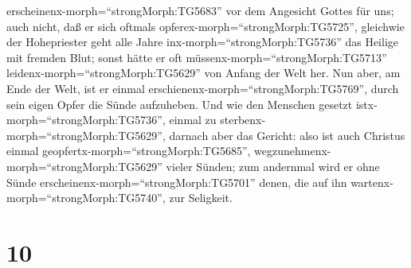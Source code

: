 erscheinenx-morph=``strongMorph:TG5683'' vor dem Angesicht Gottes für
uns;  auch nicht, daß er sich oftmals
opferex-morph=``strongMorph:TG5725'', gleichwie der Hohepriester geht
alle Jahre inx-morph=``strongMorph:TG5736'' das Heilige mit fremden
Blut;  sonst hätte er oft
müssenx-morph=``strongMorph:TG5713''
leidenx-morph=``strongMorph:TG5629'' von Anfang der Welt her. Nun aber,
am Ende der Welt, ist er einmal
erschienenx-morph=``strongMorph:TG5769'', durch sein eigen Opfer die
Sünde aufzuheben.  Und wie den Menschen gesetzt
istx-morph=``strongMorph:TG5736'', einmal zu
sterbenx-morph=``strongMorph:TG5629'', darnach aber das Gericht:
 also ist auch Christus einmal
geopfertx-morph=``strongMorph:TG5685'',
wegzunehmenx-morph=``strongMorph:TG5629'' vieler Sünden; zum andernmal
wird er ohne Sünde erscheinenx-morph=``strongMorph:TG5701'' denen, die
auf ihn wartenx-morph=``strongMorph:TG5740'', zur Seligkeit.

\hypertarget{section-9}{%
\section{10}\label{section-9}}

